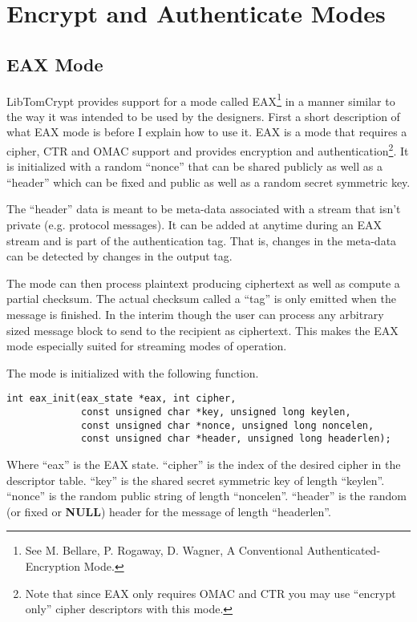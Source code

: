 \documentclass[a4paper]{book}
\begin{document}
\section{Encrypt and Authenticate Modes}

\subsection{EAX Mode}
LibTomCrypt provides support for a mode called EAX\footnote{See 
M. Bellare, P. Rogaway, D. Wagner, A Conventional Authenticated-Encryption Mode.} in a manner similar to the
way it was intended to be used by the designers.  First a short description of what EAX mode is before I explain how to use it.  
EAX is a mode that requires a cipher, CTR and OMAC support and provides encryption and authentication\footnote{Note that since EAX only requires OMAC and CTR you may use ``encrypt only'' cipher descriptors with this mode.}.  
It is initialized with a random ``nonce'' that can be shared publicly as well as a ``header'' which can be fixed and public as well as a random 
secret symmetric key.

The ``header'' data is meant to be meta-data associated with a stream that isn't private (e.g. protocol messages).  It can
be added at anytime during an EAX stream and is part of the authentication tag.  That is, changes in the meta-data can
be detected by changes in the output tag.

The mode can then process plaintext producing ciphertext as well as compute a partial checksum.  The actual checksum
called a ``tag'' is only emitted when the message is finished.  In the interim though the user can process any arbitrary
sized message block to send to the recipient as ciphertext.  This makes the EAX mode especially suited for streaming modes
of operation.

The mode is initialized with the following function.
\begin{verbatim}
int eax_init(eax_state *eax, int cipher, 
             const unsigned char *key, unsigned long keylen,
             const unsigned char *nonce, unsigned long noncelen,
             const unsigned char *header, unsigned long headerlen);
\end{verbatim}

Where ``eax'' is the EAX state.  ``cipher'' is the index of the desired cipher in the descriptor table.  
``key'' is the shared secret symmetric key of length ``keylen''.  ``nonce'' is the random public string of
length ``noncelen''.  ``header'' is the random (or fixed or \textbf{NULL}) header for the message of length
``headerlen''.
\end{document}
